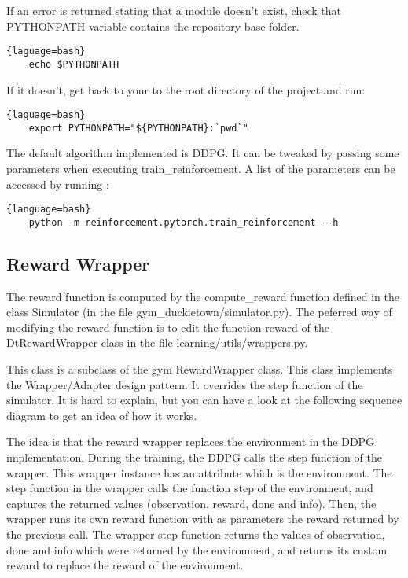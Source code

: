 \documentclass[12pt]{article}
\begin{document}
If an error is returned stating that a module doesn't exist, check that PYTHONPATH variable contains the repository base folder.

\begin{lstlisting}{laguage=bash}
    echo $PYTHONPATH
\end{lstlisting}

If it doesn't, get back to your to the root directory of the project and run: 

\begin{lstlisting}{laguage=bash}
    export PYTHONPATH="${PYTHONPATH}:`pwd`"
\end{lstlisting}

The default algorithm implemented is DDPG. It can be tweaked by passing some parameters when executing train\_reinforcement. A list of the parameters can be accessed by running :

\begin{lstlisting}{language=bash}
    python -m reinforcement.pytorch.train_reinforcement --h
\end{lstlisting}

\subsection{Reward Wrapper}
The reward function is computed by the compute\_reward function defined in the class Simulator (in the file gym\_duckietown/simulator.py). The peferred way of modifying the reward function is to edit the function reward of the DtRewardWrapper class in the file learning/utils/wrappers.py.

This class is a subclass of the gym RewardWrapper class. This class implements the Wrapper/Adapter design pattern. It overrides the step function of the simulator. It is hard to explain, but you can have a look at the following sequence diagram to get an idea of how it works.

The idea is that the reward wrapper replaces the environment in the DDPG implementation. During the training, the DDPG calls the step function of the wrapper. This wrapper instance has an attribute which is the environment. The step
function in the wrapper calls the function step of the environment, and captures the returned values (observation, reward, done and info). Then, the wrapper runs its own reward function with as parameters the reward returned by the previous call. The wrapper step function returns the values of observation, done and info which were returned by the environment, and returns its custom reward to replace the reward of the environment.
\end{document}
